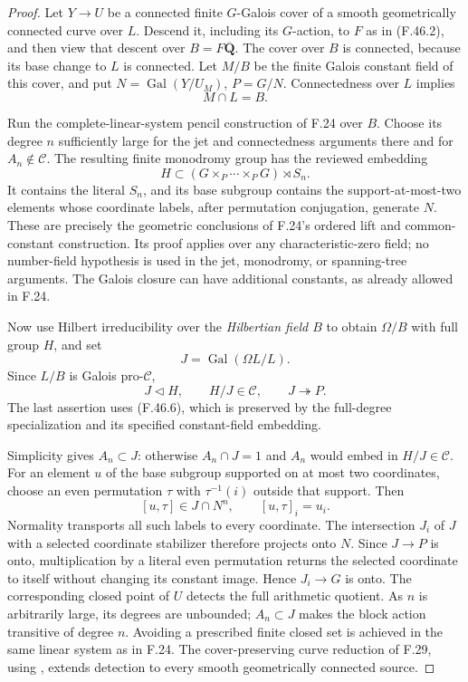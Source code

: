 \begin{proof}

Let \(Y\to U\) be a connected finite \(G\)-Galois cover of a smooth
geometrically connected curve over \(L\). Descend it, including its
\(G\)-action, to \(F\) as in \textup{(F.46.2)}, and then view that descent over
\(B=F\overline{\mathbf Q}\). The cover over \(B\) is connected,
because its base change to \(L\) is connected. Let \(M/B\) be the
finite Galois constant field of this cover, and put
\(N=\operatorname{Gal}(Y/ U_M)\), \(P=G/N\). Connectedness over
\(L\) implies
\[
                             M\cap L=B.                   \tag{F.46.6}
\]

Run the complete-linear-system pencil construction of F.24 over \(B\).
Choose its degree \(n\) sufficiently large for the jet and connectedness
arguments there and for \(A_n\notin\mathcal C\). The resulting finite
monodromy group has the reviewed embedding
\[
 H\subset (G\times_P\cdots\times_PG)\rtimes S_n.           \tag{F.46.7}
\]
It contains the literal \(S_n\), and its base subgroup contains the
support-at-most-two elements whose coordinate labels, after permutation
conjugation, generate \(N\). These are precisely the geometric
conclusions of F.24's ordered lift and common-constant construction. Its
proof applies over any characteristic-zero field; no number-field
hypothesis is used in the jet, monodromy, or spanning-tree arguments.
The Galois closure can have additional constants, as already allowed in
F.24.

Now use Hilbert irreducibility over the \emph{Hilbertian field \(B\)} to
obtain \(\Omega/B\) with full group \(H\), and set
\[
                    J=\operatorname{Gal}(\Omega L/L).
\]
Since \(L/B\) is Galois pro-\(\mathcal C\),
\[
        J\triangleleft H,\qquad H/J\in\mathcal C,
                         \qquad J\twoheadrightarrow P.    \tag{F.46.8}
\]
The last assertion uses \textup{(F.46.6)}, which is preserved by the full-degree
specialization and its specified constant-field embedding.

Simplicity gives \(A_n\subset J\): otherwise
\(A_n\cap J=1\) and \(A_n\) would embed in \(H/J\in\mathcal C\).
For an element \(u\) of the base subgroup supported on at most two
coordinates, choose an even permutation \(\tau\) with
\(\tau^{-1}(i)\) outside that support. Then
\[
        [u,\tau]\in J\cap N^n,
                     \qquad [u,\tau]_i=u_i.               \tag{F.46.9}
\]
Normality transports all such labels to every coordinate. The
intersection \(J_i\) of \(J\) with a selected coordinate stabilizer
therefore projects onto \(N\). Since \(J\to P\) is onto, multiplication
by a literal even permutation returns the selected coordinate to itself
without changing its constant image. Hence \(J_i\to G\) is onto.
The corresponding closed point of \(U\) detects the full arithmetic
quotient. As \(n\) is arbitrarily large, its degrees are unbounded;
\(A_n\subset J\) makes the block action transitive of degree \(n\).
Avoiding a prescribed finite closed set is achieved in the same linear
system as in F.24. The cover-preserving curve reduction of F.29, using \citet[Theorem~1.5]{F_PoonenSlavov2020}, extends
detection to every smooth geometrically connected source.


\end{proof}
